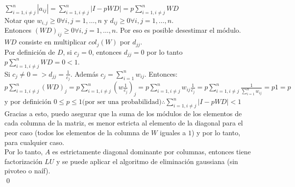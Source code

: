 		$\sum_{i=1, i \neq j}^{n} |a_{ij}| = \sum_{i=1, i \neq j}^{n} |I-pWD| = p \sum_{i=1, i \neq j}^{n} WD$ \\

		Notar que $w_{i,j} \geq 0 \forall i,j = 1, \hdots, n$ y $d_{ij} \geq 0 \forall i,j = 1, \hdots, n$. \\

		Entonces $(WD)_{ij} \geq 0 \forall i,j = 1, \hdots, n$. Por eso es posible desestimar el módulo. \\

		$WD$ consiste en multiplicar $col_{j}(W)$ por $d_{jj}$. \\

		Por definición de $D$, si $c_{j} = 0$, entonces $d_{jj} = 0$ por lo tanto $p \sum_{i=1, i \neq j}^{n} WD = 0 < 1$. \\

		Si $c_{j} \neq 0 => d_{jj} = \frac{1}{c_{j}}$. Además $c_{j} = \sum_{i=1}^{n} w_{ij}$. Entonces:\\

		$ p \sum_{i=1, i \neq j}^{n} (WD)_{j} = p \sum_{i=1, i \neq j}^{n} (w \frac{1}{c_{j}})_{j} =
		  p \sum_{i=1, i \neq j}^{n} w_{ij} \frac{1}{c_j} = p \sum_{i=1, i \neq j}^{n} \frac{1}{\sum_{i=1}^{n} w_{ij}} =
		  p 1 = p													$ \\

		y por definición $0 \leq p \leq 1 \text{(por ser una probabilidad)} \therefore \sum_{i=1, i \neq j}^{n} |I-pWD| < 1$ \\

		Gracias a esto, puedo asegurar que la suma de los módulos de los elementos de cada columna de la matriz, es menor estricta al elemento de la diagonal para el peor caso (todos los elementos de la columna de $W$ iguales a $1$) y por lo tanto, para cualquier caso. \\

		Por lo tanto, $A$ es estrictamente diagonal dominante por columnas, entonces tiene factorización $LU$ y se puede aplicar el algoritmo de eliminación gaussiana (sin pivoteo o naíf). \\

		\qed

	\clearpage

